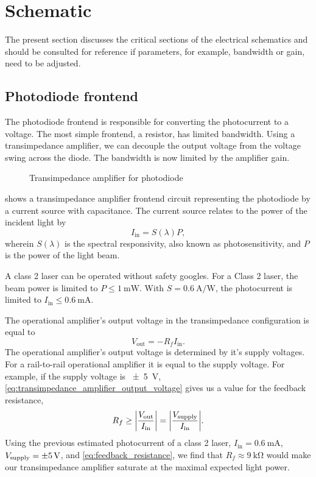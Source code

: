 \section{Schematic}

The present section discusses the critical sections of the electrical schematics and should be consulted for reference if parameters, for example, bandwidth or gain, need to be adjusted.

\subsection{Photodiode frontend}

The photodiode frontend is responsible for converting the photocurrent to a voltage.
The most simple frontend, a resistor, has limited bandwidth.
Using a transimpedance amplifier, we can decouple the output voltage from the voltage swing across the diode.
The bandwidth is now limited by the amplifier gain.

\begin{figure}[H]
	\centering
	
 	\caption{Transimpedance amplifier for photodiode}\label{fig:transimpedance_amplifier}
\end{figure}

 shows a transimpedance amplifier frontend circuit representing the photodiode by a current source with capacitance.
The current source relates to the power of the incident light by
\begin{equation}
I_\text{in} = S(\lambda) P,
\end{equation}
wherein $S(\lambda)$ is the spectral responsivity, also known as photosensitivity, and $P$ is the power of the light beam.

A class 2 laser can be operated without safety googles.
For a Class 2 laser, the beam power is limited to $P\leq\SI{1}{\milli\watt}$. With $S=\SI{0.6}{\ampere\per\watt}$, the photocurrent is limited to $I_\text{in}\leq\SI{0.6}{\milli\ampere}$.

The operational amplifier's output voltage in the transimpedance configuration is equal to
\begin{equation}
	V_\text{out} = - R_f I_\text{in}.
	\label{eq:transimpedance_amplifier_output_voltage}
\end{equation}
The operational amplifier's output voltage is determined by it's supply voltages.
For a rail-to-rail operational amplifier it is equal to the supply voltage.
For example, if the supply voltage is \SI{\pm5}{\volt}, \cref{eq:transimpedance_amplifier_output_voltage} gives us a value for the feedback resistance,
\begin{equation}
	R_f\geq\abs{\frac{V_\text{out}}{I_\text{in}}}=\abs{\frac{V_\text{supply}}{I_\text{in}}}
	\label{eq:feedback_resistance}.
\end{equation}
Using the previous estimated photocurrent of a class 2 laser, $I_\text{in}=\SI{0.6}{\milli\ampere}$, $V_\text{supply}=\SI{\pm5}{\volt}$, and \cref{eq:feedback_resistance}, we find that $R_f\approx\SI{9}{\kilo\ohm}$ would make our transimpedance amplifier saturate at the maximal expected light power.

